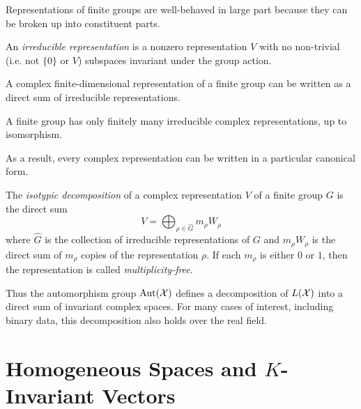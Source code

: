 \documentclass[cclicense]{hmcthesis}
\numberwithin{equation}{chapter}
\numberwithin{ucounter}{chapter}
\begin{document}
    Representations of finite groups are well-behaved in large part because they
    can be broken up into constituent parts.

    \begin{definition}
        An \emph{irreducible representation} is a nonzero representation $V$
        with no non-trivial (i.e. not $\{0\}$ or $V$) subspaces invariant under
        the group action.
    \end{definition}

    \begin{theorem}[Maschke]
        A complex finite-dimensional representation of a finite group can be
        written as a direct sum of irreducible representations.
    \end{theorem}

    \begin{theorem}
        A finite group has only finitely many irreducible complex
        representations, up to isomorphism.
    \end{theorem}

    As a result, every complex representation can be written in a particular
    canonical form.
    
    \begin{definition}
        The \emph{isotypic decomposition} of a complex representation $V$ of a
        finite group $G$ is the direct sum
        \[
            V = \bigoplus_{\rho \in \widehat{G}}  m_\rho W_\rho
        \]
        where $\widehat G$ is the collection of irreducible representations of
        $G$ and $m_\rho W_\rho$ is the direct sum of $m_\rho$ copies of the
        representation $\rho$.  If each $m_\rho$ is either $0$ or $1$, then the
        representation is called \emph{multiplicity-free}.
    \end{definition}

    Thus the automorphism group $\operatorname{Aut}(\mathcal{X})$ defines a decomposition of $L(\mathcal{X})$
    into a direct sum of invariant complex spaces.  For many cases of interest,
    including binary data, this decomposition also holds over the real field.


\section{Homogeneous Spaces and $K$-Invariant Vectors}
\end{document}
